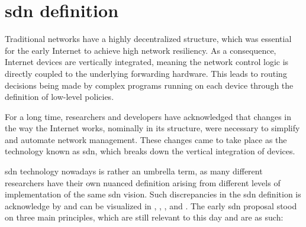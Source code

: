 \section[SDN definition]{\gls{sdn} definition}

Traditional networks have a highly decentralized structure, which was essential for the early Internet to achieve high network resiliency. As a consequence, Internet devices are vertically integrated, meaning the network control logic is directly coupled to the underlying forwarding hardware. This leads to routing decisions being made by complex programs running on each device through the definition of low-level policies\cite{bifulco_survey_2018}. 

For a long time, researchers and developers have acknowledged that changes in the way the Internet works, nominally in its structure, were necessary to simplify and automate network management. These changes came to take place as the technology known as \gls{sdn}, which breaks down the vertical integration of devices\cite{thyagaturu_software_2016}.  

\gls{sdn} technology nowadays is rather an umbrella term, as many different researchers have their own nuanced definition arising from different levels of implementation of the same \gls{sdn} vision. Such discrepancies in the \gls{sdn} definition is acknowledge by \cite{peterson_software-defined_2021} and can be visualized in \cite{feamster_road_2013}, \cite{thyagaturu_software_2016}, \cite{nunes_survey_2014}, and \cite{bifulco_survey_2018}.
The early \gls{sdn} proposal stood on three main principles, which are still relevant to this day and are as such:


